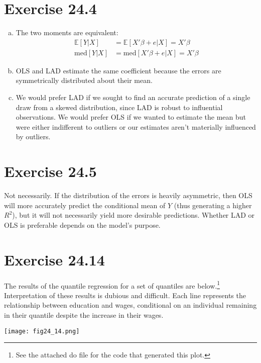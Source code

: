 \documentclass{article}
\newcommand{\E}[1]{\mathbb{E}\left[#1\right]}%
\begin{document}

\section*{Exercise 24.4}

\begin{enumerate}[(a)]
	\item The two moments are equivalent:
		\begin{align*}
			\E{Y|X}			&= \E{X'\beta + e|X} 			= X'\beta	\\
			\text{med}[Y|X]	&= \text{med}[X'\beta + e|X]	= X'\beta
		\end{align*}
	
	\item OLS and LAD estimate the same coefficient because the errors are symmetrically distributed about their mean.
	
	\item We would prefer LAD if we sought to find an accurate prediction of a single draw from a skewed distribution, since LAD is robust to influential observations. We would prefer OLS if we wanted to estimate the mean but were either indifferent to outliers or our estimates aren't materially influenced by outliers.
	
\end{enumerate}



\section*{Exercise 24.5}
Not necessarily. If the distribution of the errors is heavily asymmetric, then OLS will more accurately predict the conditional mean of $Y$ (thus generating a higher $R^2$), but it will not necessarily yield more desirable predictions. Whether LAD or OLS  is preferable depends on the model's purpose.


\section*{Exercise 24.14}
The results of the quantile regression for a set of quantiles are below.\footnote{See the attached do file for the code that generated this plot.} Interpretation of these results is dubious and difficult. Each line represents the relationship between education and wages, conditional on an individual remaining in their quantile despite the increase in their wages.
\begin{center}
	\texttt{[image: fig24\_14.png]}
\end{center}

\end{document}
